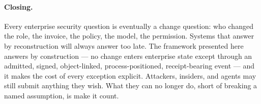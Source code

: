 \paragraph{Closing.}
Every enterprise security question is eventually a change question: who
changed the role, the invoice, the policy, the model, the permission. Systems
that answer by reconstruction will always answer too late. The framework
presented here answers by construction --- no change enters enterprise state
except through an admitted, signed, object-linked, process-positioned,
receipt-bearing event --- and it makes the cost of every exception explicit.
Attackers, insiders, and agents may still submit anything they wish. What they
can no longer do, short of breaking a named assumption, is make it count.
